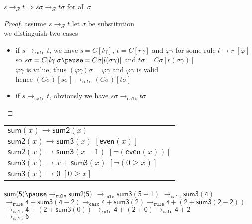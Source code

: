 \documentclass[12pt,aspectratio=169]{beamer}
\newcommand{\m}[1]{\mathsf{#1}}
\newcommand{\RR}{\mathcal{R}}
\newcommand{\torule}{\to_{\mathtt{rule}}}
\newcommand{\tocalc}{\to_{\mathtt{calc}}}
\begin{document}
\begin{frame}
    \begin{theorem}
            $s \to_{\RR} t \Rightarrow s\sigma \to_{\RR} t\sigma$ for all $\sigma$
    \end{theorem}
    \begin{proof}
        assume $s \to_{\RR} t$ \pause \quad
        let $\sigma$ be substitution\\ we distinguish two cases \pause
        \begin{itemize}
            \item if $s \torule t$,
                \pause
                we have $s=C[l\gamma]$, $t=C[r\gamma]$ and $\varphi\gamma$ for some rule $l \to r \; [\varphi]$\\
                \pause
                so $s\sigma = C[l\gamma]\sigma \pause = C\sigma[l(\sigma\gamma)]$
                \pause and $t\sigma = C\sigma[r(\sigma\gamma)]$\\
                \pause
                $\varphi\gamma$ is value, thus $(\varphi\gamma)\sigma = \varphi\gamma$ and $\varphi\gamma$ is valid\\
                \pause
                hence $(C\sigma)[s\sigma] \torule (C\sigma)[t\sigma]$
            \pause
            \item if $s \tocalc t$, obviously we have $s\sigma \tocalc t\sigma$
        \end{itemize}
    \end{proof}
\end{frame}



\begin{frame}
    \begin{example}
        \begin{table}
        \begin{tabular}{l}
            $\m{sum}(x) \to \m{sum2}(x)$ \\
            $\m{sum2}(x) \to \m{sum3}(x) \; [\m{even}(x)]$ \\
            $\m{sum2}(x) \to \m{sum3}(x-1) \; [\neg(\m{even}(x))]$ \\
            $\m{sum3}(x) \to x + \m{sum3}(x) \; [\neg(0 \geq x)]$ \\
            $\m{sum3}(x) \to \m{0} \; [0 \geq x]$
        \end{tabular}
    \end{table}
        \bigskip
            \quad $\m{sum}(\m{5}) \pause \torule \m{sum2}(\m{5})$
            $\torule \m{sum3}(\m{5} - \m{1})$ \pause 
            $\tocalc \m{sum3}(\m{4})$\\
            \quad $\torule \m{4} + \m{sum3}(\m{4} -\m{2}) \tocalc \m{4} + \m{sum3}(\m{2}) \torule \m{4} + (\m{2} + \m{sum3}(\m{2}-\m{2}))$\\
            \pause
            \quad $\tocalc \m{4} + (\m{2} + \m{sum3}(0)) \torule \m{4} + (\m{2} + \m{0}) \tocalc \m{4} + \m{2}$ \\
            \pause
            \quad $\tocalc \m{6}$
    \end{example}
\end{frame}
\end{document}
